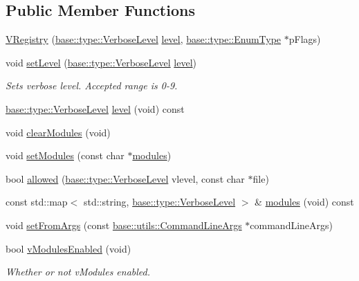 \subsection*{Public Member Functions}
\begin{DoxyCompactItemize}
\item 
\hyperlink{classel_1_1base_1_1_v_registry_ac4b36d32d3722238024480ce66c52ad0}{V\+Registry} (\hyperlink{namespaceel_1_1base_1_1type_a3f79fa74639a13c32f794ba074fe7fb4}{base\+::type\+::\+Verbose\+Level} \hyperlink{classel_1_1base_1_1_v_registry_ad68e225738ecde9a5a59e9fcdfdcc1b9}{level}, \hyperlink{namespaceel_1_1base_1_1type_afb892a99b7545bf6e45c1e1d84af2ec9}{base\+::type\+::\+Enum\+Type} $\ast$p\+Flags)
\item 
void \hyperlink{classel_1_1base_1_1_v_registry_aea4fb84a03363080ee2501193084f71f}{set\+Level} (\hyperlink{namespaceel_1_1base_1_1type_a3f79fa74639a13c32f794ba074fe7fb4}{base\+::type\+::\+Verbose\+Level} \hyperlink{classel_1_1base_1_1_v_registry_ad68e225738ecde9a5a59e9fcdfdcc1b9}{level})
\begin{DoxyCompactList}\small\item\em Sets verbose level. Accepted range is 0-\/9. \end{DoxyCompactList}\item 
\hyperlink{namespaceel_1_1base_1_1type_a3f79fa74639a13c32f794ba074fe7fb4}{base\+::type\+::\+Verbose\+Level} \hyperlink{classel_1_1base_1_1_v_registry_ad68e225738ecde9a5a59e9fcdfdcc1b9}{level} (void) const 
\item 
void \hyperlink{classel_1_1base_1_1_v_registry_a52de90db82e57827ac3d3994f70c17cf}{clear\+Modules} (void)
\item 
void \hyperlink{classel_1_1base_1_1_v_registry_a65e202cc547cd11231d3ea0fb70765d0}{set\+Modules} (const char $\ast$\hyperlink{classel_1_1base_1_1_v_registry_abc23bea6b9f2884caa6d5aadc8769892}{modules})
\item 
bool \hyperlink{classel_1_1base_1_1_v_registry_a13b725e3da8935fce5cf3c16fd3a2ff9}{allowed} (\hyperlink{namespaceel_1_1base_1_1type_a3f79fa74639a13c32f794ba074fe7fb4}{base\+::type\+::\+Verbose\+Level} vlevel, const char $\ast$file)
\item 
const std\+::map$<$ std\+::string, \hyperlink{namespaceel_1_1base_1_1type_a3f79fa74639a13c32f794ba074fe7fb4}{base\+::type\+::\+Verbose\+Level} $>$ \& \hyperlink{classel_1_1base_1_1_v_registry_abc23bea6b9f2884caa6d5aadc8769892}{modules} (void) const 
\item 
void \hyperlink{classel_1_1base_1_1_v_registry_a811e62d7d016a0714b4363f47216a9da}{set\+From\+Args} (const \hyperlink{classel_1_1base_1_1utils_1_1_command_line_args}{base\+::utils\+::\+Command\+Line\+Args} $\ast$command\+Line\+Args)
\item 
bool \hyperlink{classel_1_1base_1_1_v_registry_ad7a8e939daf6b3d6b949def0a9f65a1f}{v\+Modules\+Enabled} (void)
\begin{DoxyCompactList}\small\item\em Whether or not v\+Modules enabled. \end{DoxyCompactList}\end{DoxyCompactItemize}
